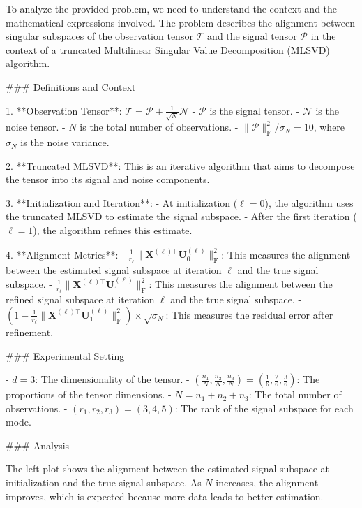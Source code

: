 To analyze the provided problem, we need to understand the context and the mathematical expressions involved. The problem describes the alignment between singular subspaces of the observation tensor \({\bm{\mathscr{T}}}\) and the signal tensor \({\bm{\mathscr{P}}}\) in the context of a truncated Multilinear Singular Value Decomposition (MLSVD) algorithm.

### Definitions and Context

1. **Observation Tensor**: \({\bm{\mathscr{T}}} = {\bm{\mathscr{P}}} + \frac{1}{\sqrt{N}}{\bm{\mathscr{N}}}\)
   - \({\bm{\mathscr{P}}}\) is the signal tensor.
   - \({\bm{\mathscr{N}}}\) is the noise tensor.
   - \(N\) is the total number of observations.
   - \(\lVert{\bm{\mathscr{P}}} \rVert_{\mathrm{F}}^2 / \sigma_N = 10\), where \(\sigma_N\) is the noise variance.

2. **Truncated MLSVD**: This is an iterative algorithm that aims to decompose the tensor into its signal and noise components.

3. **Initialization and Iteration**:
   - At initialization (\(\ell = 0\)), the algorithm uses the truncated MLSVD to estimate the signal subspace.
   - After the first iteration (\(\ell = 1\)), the algorithm refines this estimate.

4. **Alignment Metrics**:
   - \(\frac{1}{r_\ell} \lVert{\bm{X}}^{(\ell) \top} {\bm{U}}^{(\ell)}_0 \rVert_{\mathrm{F}}^2\): This measures the alignment between the estimated signal subspace at iteration \(\ell\) and the true signal subspace.
   - \(\frac{1}{r_\ell} \lVert{\bm{X}}^{(\ell) \top} {\bm{U}}^{(\ell)}_1 \rVert_{\mathrm{F}}^2\): This measures the alignment between the refined signal subspace at iteration \(\ell\) and the true signal subspace.
   - \((1 - \frac{1}{r_\ell} \lVert{\bm{X}}^{(\ell) \top} {\bm{U}}^{(\ell)}_1 \rVert_{\mathrm{F}}^2) \times \sqrt{\sigma_N}\): This measures the residual error after refinement.

### Experimental Setting

- \(d = 3\): The dimensionality of the tensor.
- \((\frac{n_1}{N}, \frac{n_2}{N}, \frac{n_3}{N}) = (\frac{1}{6}, \frac{2}{6}, \frac{3}{6})\): The proportions of the tensor dimensions.
- \(N = n_1 + n_2 + n_3\): The total number of observations.
- \((r_1, r_2, r_3) = (3, 4, 5)\): The rank of the signal subspace for each mode.

### Analysis

The left plot shows the alignment between the estimated signal subspace at initialization and the true signal subspace. As \(N\) increases, the alignment improves, which is expected because more data leads to better estimation.

